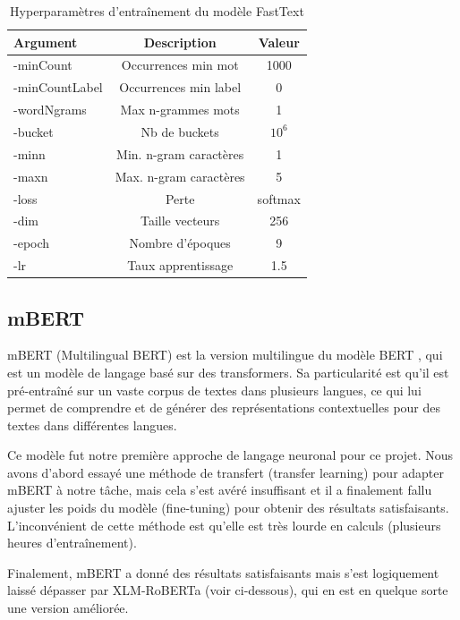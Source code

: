\begin{table}[h]
    \centering
    \small
    \begin{tabular}{lcc}
        \hline
        \textbf{Argument} & \textbf{Description} & \textbf{Valeur} \\
        \hline
        -minCount & Occurrences min mot & 1000 \\
        -minCountLabel & Occurrences min label & 0 \\
        -wordNgrams & Max n-grammes mots & 1 \\
        -bucket & Nb de buckets & $10^6$ \\
        -minn & Min. n-gram caractères & 1 \\
        -maxn & Max. n-gram caractères & 5 \\
        -loss & Perte & softmax \\
        -dim & Taille vecteurs & 256 \\
        -epoch & Nombre d'époques & 9 \\
        -lr & Taux apprentissage & 1.5 \\
        \hline
    \end{tabular}
    \caption{Hyperparamètres d'entraînement du modèle FastText}
    \label{tab:glotlid-m-hyperparams}
\end{table}

\subsection{mBERT}

mBERT (Multilingual BERT) est la version multilingue du modèle BERT \cite{devlin2019bert}, qui est un modèle de langage basé sur des transformers. Sa particularité est qu'il est pré-entraîné sur un vaste corpus de textes dans plusieurs langues, ce qui lui permet de comprendre et de générer des représentations contextuelles pour des textes dans différentes langues.

Ce modèle fut notre première approche de langage neuronal pour ce projet. Nous avons d'abord essayé une méthode de transfert (transfer learning) pour adapter mBERT à notre tâche, mais cela s'est avéré insuffisant et il a finalement fallu ajuster les poids du modèle (fine-tuning) pour obtenir des résultats satisfaisants. L'inconvénient de cette méthode est qu'elle est très lourde en calculs (plusieurs heures d'entraînement).

Finalement, mBERT a donné des résultats satisfaisants mais s'est logiquement laissé dépasser par XLM-RoBERTa (voir ci-dessous), qui en est en quelque sorte une version améliorée.

